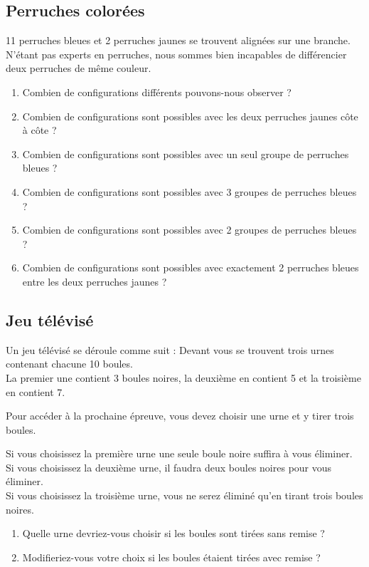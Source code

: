 \documentclass[oneside,12pt]{article}          %
\begin{document}
\subsection{Perruches colorées}
11 perruches bleues et 2 perruches jaunes se trouvent alignées sur une branche. N'étant pas experts en perruches, nous sommes bien incapables de différencier deux perruches de même couleur.

\begin{enumerate}
    \item Combien de configurations différents pouvons-nous observer ?
    \item Combien de configurations sont possibles avec les deux perruches jaunes côte à côte ?
    \item Combien de configurations sont possibles avec un seul groupe de perruches bleues ?
    \item Combien de configurations sont possibles avec 3 groupes de perruches bleues ?
    \item Combien de configurations sont possibles avec 2 groupes de perruches bleues ?
    \item Combien de configurations sont possibles avec exactement 2 perruches bleues entre les deux perruches jaunes ?
\end{enumerate}



\subsection{Jeu télévisé}
Un jeu télévisé se déroule comme suit : Devant vous se trouvent trois urnes contenant chacune 10 boules.\\
La premier une contient 3 boules noires, la deuxième en contient 5 et la troisième en contient 7.

Pour accéder à la prochaine épreuve, vous devez choisir une urne et y tirer trois boules.

Si vous choisissez la première urne une seule boule noire suffira à vous éliminer.\\
Si vous choisissez la deuxième urne, il faudra deux boules noires pour vous éliminer.\\
Si vous choisissez la troisième urne, vous ne serez éliminé qu'en tirant trois boules noires.
\begin{enumerate}
    \item Quelle urne devriez-vous choisir si les boules sont tirées sans remise ?
    \item Modifieriez-vous votre choix si les boules étaient tirées avec remise ?
\end{enumerate}
\end{document}
